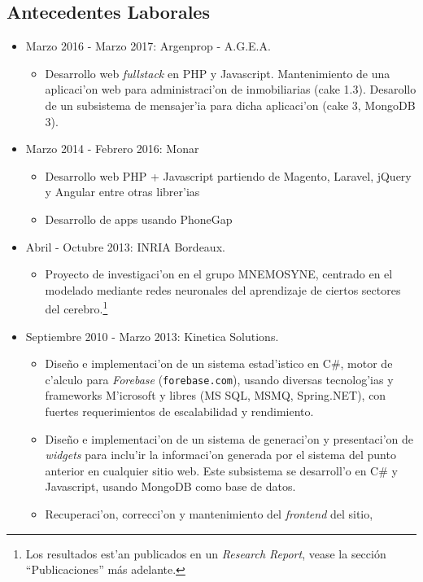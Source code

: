 \subsection*{Antecedentes Laborales}
\begin{itemize}
	\item Marzo 2016 - Marzo 2017: Argenprop - A.G.E.A.
		\begin{itemize}
			\item Desarrollo web \emph{fullstack} en PHP y Javascript.
				\subitem Mantenimiento de una aplicaci'on web para administraci'on de inmobiliarias (cake 1.3).
				\subitem Desarollo de un subsistema de mensajer'ia para dicha aplicaci'on (cake 3, MongoDB 3).
	\end{itemize}
	\item Marzo 2014 - Febrero 2016: Monar
		\begin{itemize}
			\item Desarrollo web PHP + Javascript partiendo de Magento, Laravel, jQuery y Angular
				entre otras librer'ias
			\item Desarrollo de apps usando PhoneGap
		\end{itemize}
	\item Abril - Octubre 2013: INRIA Bordeaux.
		\begin{itemize}
			\item Proyecto de investigaci'on en el grupo MNEMOSYNE, centrado en el modelado mediante
				redes neuronales del aprendizaje de ciertos sectores del cerebro.\footnote[1]{Los
					resultados est'an publicados en un \emph{Research Report}, vease la sección
					``Publicaciones'' más adelante.}
		\end{itemize}
	\item Septiembre 2010 - Marzo 2013: Kinetica Solutions.
		\begin{itemize}
			\item Dise\~no e implementaci'on de un sistema estad'istico en C\#,
				motor de c'alculo para \emph{Forebase} (\texttt{forebase.com}), usando
				diversas tecnolog'ias y frameworks M'icrosoft y libres (MS SQL, MSMQ,
				Spring.NET), con fuertes requerimientos de escalabilidad y rendimiento.
			\item Dise\~no e implementaci'on de un sistema de generaci'on y presentaci'on
				de \emph{widgets} para inclu'ir la informaci'on generada por el sistema del
				punto anterior en cualquier sitio web.  Este subsistema se desarroll'o en C\# y
				Javascript, usando MongoDB como base de datos.
			\item Recuperaci'on, correcci'on y mantenimiento del \emph{frontend} del sitio,

\end{itemize}
\end{itemize}
